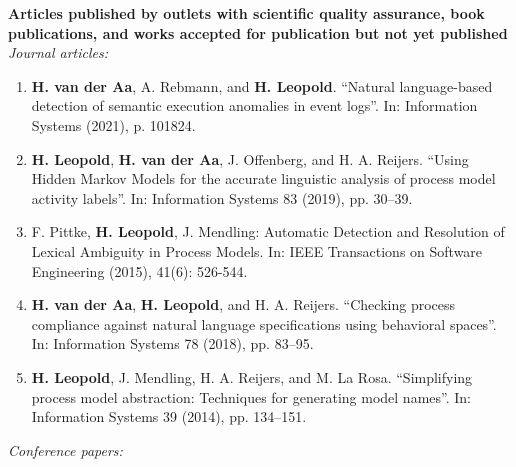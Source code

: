 
\noindent \textbf{Articles published by outlets with scientific quality assurance, book publications, and works accepted for publication but not yet published}\\[6pt]
\textit{Journal articles:}
\begingroup
\fontsize{10pt}{1}\selectfont
\begin{enumerate}[leftmargin=*]
	\item \textbf{H. van der Aa}, A. Rebmann, and \textbf{H. Leopold}. “Natural language-based detection of semantic execution anomalies in event logs”. In: Information Systems (2021), p. 101824.

	\item \textbf{H. Leopold}, \textbf{H. van der Aa}, J. Offenberg, and H. A. Reijers. “Using Hidden Markov Models for the accurate linguistic analysis of process model activity labels”. In: Information Systems 83 (2019), pp. 30–39.

	\item F. Pittke, \textbf{H. Leopold}, J. Mendling: Automatic Detection and Resolution of Lexical Ambiguity in Process Models. In: IEEE Transactions on Software Engineering (2015), 41(6): 526-544.

	\item \textbf{H. van der Aa}, \textbf{H. Leopold}, and H. A. Reijers. “Checking process compliance against natural language specifications using behavioral spaces”. In: Information Systems 78 (2018), pp. 83–95.


	\item \textbf{H. Leopold}, J. Mendling, H. A. Reijers, and M. La Rosa. “Simplifying process model abstraction: Techniques for generating model names”. In: Information Systems 39 (2014), pp. 134–151.


\end{enumerate}
\endgroup
\textit{Conference papers:}
\begingroup
\fontsize{10pt}{1}\selectfont
